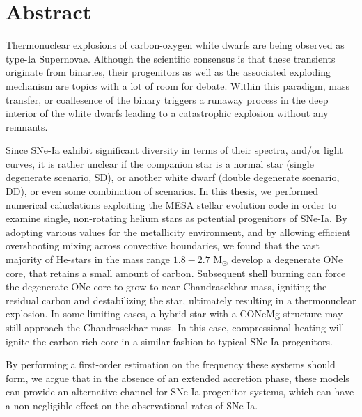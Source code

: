 \documentclass[../main/thesis_msc.tex]{subfiles}
\begin{document}
\chapter*{Abstract}

Thermonuclear explosions of carbon-oxygen white dwarfs are being observed as type-Ia Supernovae. Although the scientific consensus is that these transients originate from binaries, their progenitors as well as the associated exploding mechanism are topics with a lot of room for debate. Within this paradigm, mass transfer, or coallesence of the binary triggers a runaway process in the deep interior of the white dwarfs leading to a catastrophic explosion without any remnants.

Since SNe-Ia exhibit significant diversity in terms of their spectra, and/or light curves, it is rather unclear if the companion star is a normal star (single degenerate scenario, SD), or another white dwarf (double degenerate scenario, DD), or even some combination of scenarios. In this thesis, we performed numerical caluclations exploiting the MESA stellar evolution code in order to examine single, non-rotating helium stars as potential progenitors of SNe-Ia. By adopting various values for the metallicity environment, and by allowing efficient overshooting mixing across convective boundaries, we found that the vast majority of He-stars in the mass range $1.8-2.7$ M$_{\odot}$ develop a degenerate ONe core, that retains a small amount of carbon. Subsequent shell burning can force the degenerate ONe core to grow to near-Chandrasekhar mass, igniting the residual carbon and destabilizing the star, ultimately resulting in a thermonuclear explosion. In some limiting cases, a hybrid star with a CONeMg structure may still approach the Chandrasekhar mass. In this case, compressional heating will ignite the carbon-rich core in a similar fashion to typical SNe-Ia progenitors.

By performing a first-order estimation on the frequency these systems should form, we argue that in the absence of an extended accretion phase, these models can provide an alternative channel for SNe-Ia progenitor systems, which can have a non-negligible effect on the observational rates of SNe-Ia.
\end{document}
